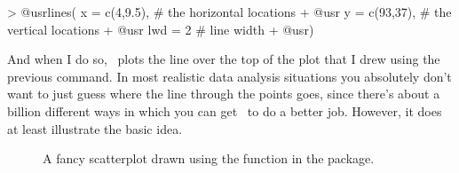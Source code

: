 \begin{rblock1}
> @usr{lines( x = c(4,9.5),}   # the horizontal locations
+ @usr{       y = c(93,37),}   # the vertical locations
+ @usr{       lwd = 2}         # line width
+ @usr{)}
\end{rblock1}
And when I do so, \R\ plots the line over the top of the plot that I drew using the previous command. In most realistic data analysis situations you absolutely don't want to just guess where the line through the points goes, since there's about a billion different ways in which you can get \R\ to do a better job. However, it does at least illustrate the basic idea. 


\begin{figure}[t]
\begin{center}
\caption{A fancy scatterplot drawn using the  function in the  package.}
\HR
\label{fig:fancyscatter}
\end{center}
\end{figure}

